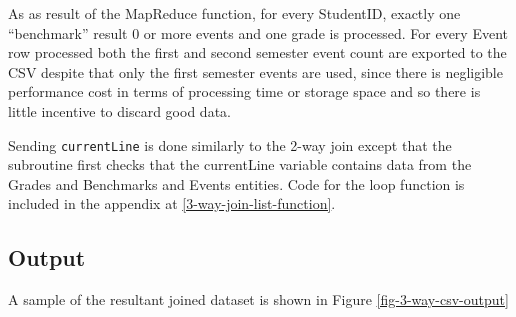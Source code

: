 As as result of the MapReduce function, for every StudentID, exactly one ``benchmark'' result 0 or more events and one grade is processed. For every Event row processed both the first and second semester event count are exported to the CSV despite that only the first semester events are used, since there is negligible performance cost in terms of processing time or storage space and so there is little incentive to discard good data.

Sending \texttt{currentLine} is done similarly to the 2-way join except that the subroutine first checks that the currentLine variable contains data from the Grades and Benchmarks and Events entities. Code for the loop function is included in the appendix at \ref{3-way-join-list-function}.



\subsection{Output}
A sample of the resultant joined dataset is shown in Figure \ref{fig-3-way-csv-output}
